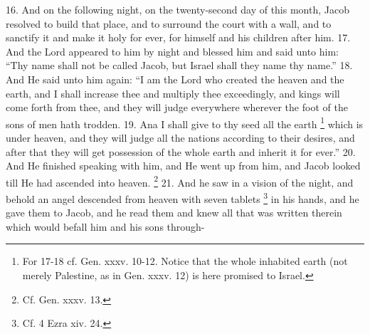 16. And on the following night, on the twenty-second day of this month, Jacob resolved to build that place, and to surround the court with a wall, and to sanctify it and make it holy for ever, for himself and his children after him. 17. And the Lord appeared to him by night and blessed him and said unto him: ``Thy name shall not be called Jacob, but Israel shall they name thy name.'' 18. And He said unto him again: ``I am the Lord who created the heaven and the earth, and I shall increase thee and multiply thee exceedingly, and kings will come forth from thee, and they will judge everywhere wherever the foot of the sons of men hath trodden. 19. Ana I shall give to thy seed all the earth \footnote{For 17-18 cf. Gen. xxxv. 10-12. Notice that the whole inhabited earth (not merely Palestine, as in Gen. xxxv. 12) is here promised to Israel.} which is under heaven, and they will judge all the nations according to their desires, and after that they will get possession of the whole earth and inherit it for ever.'' 20. And He finished speaking with him, and He went up from him, and Jacob looked till He had ascended into heaven. \footnote{Cf. Gen. xxxv. 13.} 21. And he saw in a vision of the night, and behold an angel descended from heaven with seven tablets \footnote{Cf. 4 Ezra xiv. 24.} in his hands, and he gave them to Jacob, and he read them and knew all that was written therein which would befall him and his sons through-

